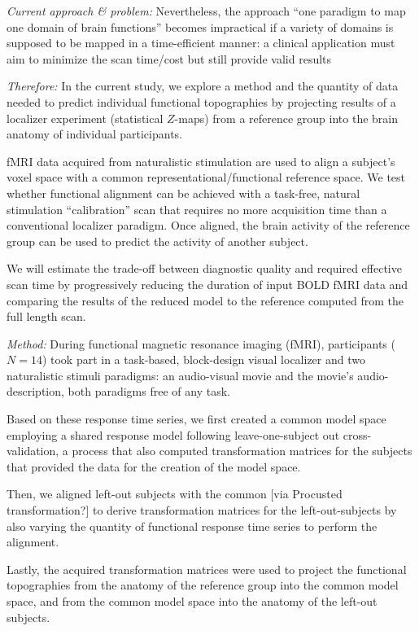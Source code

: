 \textit{Current approach \& problem:} Nevertheless, the approach ``one paradigm
to map one domain of brain functions'' becomes impractical if a variety of
domains is supposed to be mapped in a time-efficient manner:
%
a clinical application must aim to minimize the scan time/cost but still provide
valid results

\textit{Therefore:} In the current study, we explore a method and the quantity
of data needed to predict individual functional topographies by projecting
results of a localizer experiment (statistical $Z$-maps) from a reference group
into the brain anatomy of individual participants.

%
fMRI data acquired from naturalistic stimulation are used to align a subject's
voxel space with a common representational/functional reference space.
%
We test whether functional alignment can be achieved with a task-free, natural
stimulation ``calibration'' scan that requires no more acquisition time than a
conventional localizer paradigm.
%
Once aligned, the brain activity of the reference group can be used to predict
the activity of another subject.

%
We will estimate the trade-off between diagnostic quality and required effective
scan time by progressively reducing the duration of input BOLD fMRI data and
comparing the results of the reduced model to the reference computed from the
full length scan.


\textit{Method:}
During functional magnetic resonance imaging (fMRI), participants ($N=14$) took
part in a task-based, block-design visual localizer and two naturalistic stimuli
paradigms: an audio-visual movie and the movie's audio-description, both
paradigms free of any task.

Based on these response time series, we first created a common model space
employing a shared response model \citep{chen2015reduced} following
leave-one-subject out cross-validation, a process that also computed
transformation matrices for the subjects that provided the data for the creation
of the model space.

Then, we aligned left-out subjects with the common [via Procusted
transformation?] to derive transformation matrices for the left-out-subjects by
also varying the quantity of functional response time series to perform the
alignment.

Lastly, the acquired transformation matrices were used to project the functional
topographies from the anatomy of the reference group into the common model
space, and from the common model space into the anatomy of the left-out
subjects.

